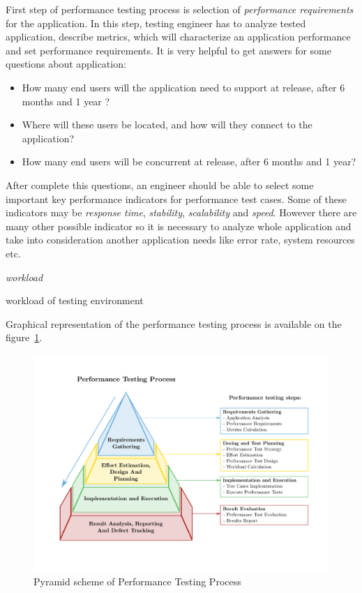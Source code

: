 First step of performance testing process is selection of \emph{performance requirements} for the application. In this step, testing engineer has to analyze tested application, describe metrics, which will characterize an application performance and set performance requirements. It is very helpful to get answers for some questions about application:

\begin{itemize}
	\setlength\itemsep{0em}
	\item How many end users will the application need to support at release, after 6 months and 1 year ?
	\item Where will these users be located, and how will they connect to the application?
	\item How many end users will be concurrent at release, after 6 months and 1 year?
\end{itemize}

After complete this questions, an engineer should be able to select some important key performance indicators for performance test cases. Some of these indicators may be \emph{response time}, \emph{stability}, \emph{scalability} and \emph{speed}. However there are many other possible indicator so it is necessary to analyze whole application and take into consideration another application needs like error rate, system resources etc.  



\emph{workload} 

workload of testing environment


Graphical representation of the performance testing process is available on the figure~\ref{fig:performace_testing_process}. 

\begin{figure}[H]
  \centering
  \includegraphics[width=16cm]{obrazky-figures/pyramid.pdf}
  \caption{Pyramid scheme of Performance Testing Process}
  \label{fig:performace_testing_process}
\end{figure}

